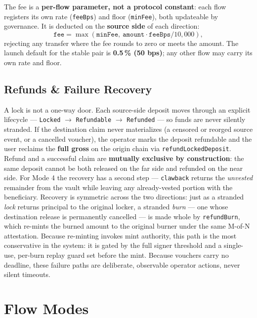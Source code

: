 \documentclass[11pt,a4paper]{article}
\begin{document}
The fee is a \textbf{per-flow parameter, not a protocol constant}: each flow registers its own rate (\texttt{feeBps}) and floor (\texttt{minFee}), both updateable by governance. It is deducted on the \textbf{source side} of each direction:
\[
\texttt{fee} = \max(\texttt{minFee},\ \texttt{amount} \cdot \texttt{feeBps} / 10{,}000),
\]
rejecting any transfer where the fee rounds to zero or meets the amount. The launch default for the stable pair is \textbf{0.5\,\% (50 bps)}; any other flow may carry its own rate and floor.

\subsection{Refunds \& Failure Recovery}

A lock is not a one-way door. Each source-side deposit moves through an explicit lifecycle --- \texttt{Locked} $\rightarrow$ \texttt{Refundable} $\rightarrow$ \texttt{Refunded} --- so funds are never silently stranded. If the destination claim never materializes (a censored or reorged source event, or a cancelled voucher), the operator marks the deposit refundable and the user reclaims the \textbf{full gross} on the origin chain via \texttt{refundLockedDeposit}. Refund and a successful claim are \textbf{mutually exclusive by construction}: the same deposit cannot be both released on the far side and refunded on the near side. For Mode 4 the recovery has a second step --- \texttt{clawback} returns the \emph{unvested} remainder from the vault while leaving any already-vested portion with the beneficiary. Recovery is symmetric across the two directions: just as a stranded \emph{lock} returns principal to the original locker, a stranded \emph{burn} --- one whose destination release is permanently cancelled --- is made whole by \texttt{refundBurn}, which re-mints the burned amount to the original burner under the same M-of-N attestation. Because re-minting invokes mint authority, this path is the most conservative in the system: it is gated by the full signer threshold and a single-use, per-burn replay guard set before the mint. Because vouchers carry no deadline, these failure paths are deliberate, observable operator actions, never silent timeouts.

\section{Flow Modes}
\end{document}
